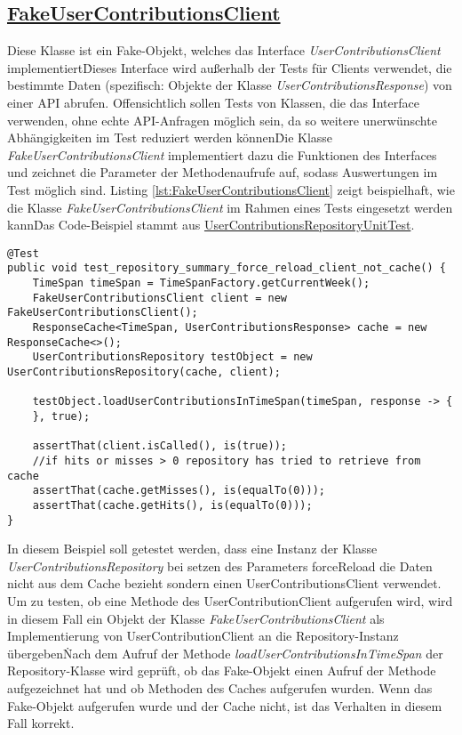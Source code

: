 \subsection*{\href{https://github.com/lukaspanni/OpenSourceStats/blob/main/app/src/test/java/de/lukaspanni/opensourcestats/mock/FakeUserContributionsClient.java}{FakeUserContributionsClient}}
Diese Klasse ist ein Fake-Objekt, welches das Interface \textit{UserContributionsClient} implementiert\.
Dieses Interface wird außerhalb der Tests für Clients verwendet, die bestimmte Daten (spezifisch: Objekte der Klasse \textit{UserContributionsResponse}) von einer API abrufen.
\newline
Offensichtlich sollen Tests von Klassen, die das Interface verwenden, ohne echte API-Anfragen möglich sein, da so weitere unerwünschte Abhängigkeiten im Test reduziert werden können\.
Die Klasse  \textit{FakeUserContributionsClient} implementiert dazu die Funktionen des Interfaces und zeichnet die Parameter der Methodenaufrufe auf, sodass Auswertungen im Test möglich sind.
\newline
Listing \ref{lst:FakeUserContributionsClient} zeigt beispielhaft, wie die Klasse \textit{FakeUserContributionsClient} im Rahmen eines Tests eingesetzt werden kann\.
Das Code-Beispiel stammt aus \href{https://github.com/lukaspanni/OpenSourceStats/blob/eafe840d0bfc8a08beca01709003d5afe7e59963/app/src/test/java/de/lukaspanni/opensourcestats/UserContributionsRepositoryUnitTest.java#L33-L47}{UserContributionsRepositoryUnitTest}.
\begin{lstlisting}[caption={Beispielhafte Verwendung von FakeUserContributionsClient}, label={lst:FakeUserContributionsClient}, captionpos={b}]
@Test
public void test_repository_summary_force_reload_client_not_cache() {
    TimeSpan timeSpan = TimeSpanFactory.getCurrentWeek();
    FakeUserContributionsClient client = new FakeUserContributionsClient();
    ResponseCache<TimeSpan, UserContributionsResponse> cache = new ResponseCache<>();
    UserContributionsRepository testObject = new UserContributionsRepository(cache, client);

    testObject.loadUserContributionsInTimeSpan(timeSpan, response -> {
    }, true);

    assertThat(client.isCalled(), is(true));
    //if hits or misses > 0 repository has tried to retrieve from cache
    assertThat(cache.getMisses(), is(equalTo(0)));
    assertThat(cache.getHits(), is(equalTo(0)));
}
\end{lstlisting}
In diesem Beispiel soll getestet werden, dass eine Instanz der Klasse \textit{UserContributionsRepository} bei setzen des Parameters forceReload die Daten nicht aus dem Cache bezieht sondern einen UserContributionsClient verwendet.
Um zu testen, ob eine Methode des UserContributionClient aufgerufen wird, wird in diesem Fall ein Objekt der Klasse \textit{FakeUserContributionsClient} als Implementierung von UserContributionClient an die Repository-Instanz übergeben\.
Nach dem Aufruf der Methode \textit{loadUserContributionsInTimeSpan} der Repository-Klasse wird geprüft, ob das Fake-Objekt einen Aufruf der Methode aufgezeichnet hat und ob Methoden des Caches aufgerufen wurden.
Wenn das Fake-Objekt aufgerufen wurde und der Cache nicht, ist das Verhalten in diesem Fall korrekt.

